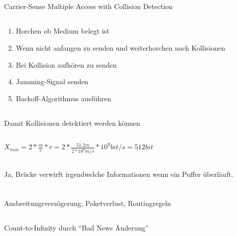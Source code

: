 \documentclass[a4paper]{article}
\begin{document}
\subsection{}
Carrier-Sense Multiple Access with Collision Detection
\subsection{}
\begin{enumerate}
\item Horchen ob Medium belegt ist
\item Wenn nicht anfangen zu senden und weiterhorchen nach Kollisionen
\item Bei Kollision aufhören zu senden
\item Jamming-Signal senden
\item Backoff-Algorithmus ausführen
\end{enumerate}
\subsection{}
Damit Kollisionen detektiert werden können
\subsection{}
$X_{min} = 2 * \frac{m}{v} * r = 2 * \frac{51.2m}{2*10^8 m/s} * 10^9 bit/s = 512 bit$
\subsection{}
Ja, Brücke verwirft irgendwelche Informationen wenn ein Puffer überläuft.
\pagebreak
\section{}
\subsection{}
Ausbreitungsverzögerung, Paketverlust, Routingregeln
\subsection{}
\subsection{}
Count-to-Infinity durch ``Bad News Änderung''
\pagebreak
\section{}
\end{document}
